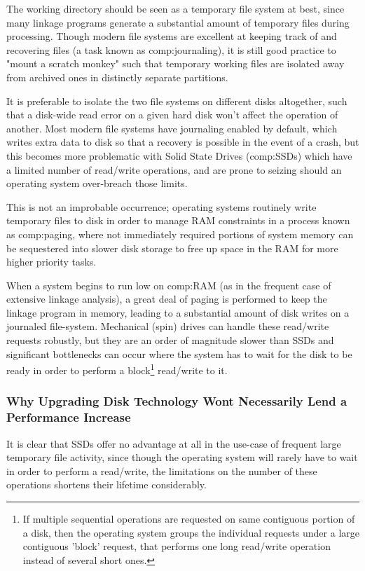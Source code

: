 The working directory should be seen as a temporary file system at best, since many linkage programs generate a substantial amount of temporary files during processing. Though modern file systems are excellent at keeping track of and recovering files (a task known as \gls{comp:journaling}), it is still good practice to "mount a scratch monkey" such that temporary working files are isolated away from archived ones in distinctly separate partitions. 

It is preferable to isolate the two file systems on different disks altogether, such that a disk-wide read error on a given hard disk won't affect the operation of another. Most modern file systems have journaling enabled by default, which writes extra data to disk so that a recovery is possible in the event of a crash, but this becomes more problematic with Solid State Drives (\gls{comp:SSD}s) which have a limited number of read/write operations, and are prone to seizing should an operating system over-breach those limits.

This is not an improbable occurrence; operating systems routinely write temporary files to disk in order to manage RAM constraints in a process known as \gls{comp:paging}, where not immediately required portions of system memory can be sequestered into slower disk storage to free up space in the RAM for more higher priority tasks. 

When a system begins to run low on \gls{comp:RAM} (as in the frequent case of extensive linkage analysis), a great deal of paging is performed to keep the linkage program in memory, leading to a substantial amount of disk writes on a journaled file-system. Mechanical (spin) drives can handle these read/write requests robustly, but they are an order of magnitude slower than SSDs and significant bottlenecks can occur where the system has to wait for the disk to be ready in order to perform a block\footnote{If multiple sequential operations are requested on same contiguous portion of a disk, then the operating system groups the individual requests under a large contiguous 'block' request, that performs one long read/write operation instead of several short ones.}    read/write to it.


\subsubsection{Why Upgrading Disk Technology Wont Necessarily Lend a Performance Increase}
It is clear that SSDs offer no advantage at all in the use-case of frequent large temporary file activity, since though the operating system will rarely have to wait in order to perform a read/write, the limitations on the number of these operations shortens their lifetime considerably.

